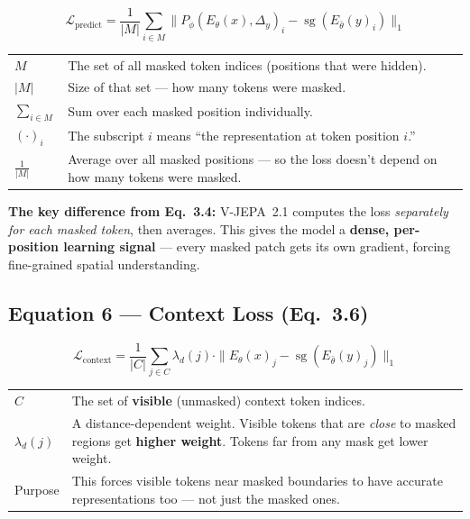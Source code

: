 \documentclass[12pt, a4paper]{article}
\begin{document}
\begin{eqbox}
\[
\mathcal{L}_{\text{predict}} = \frac{1}{|M|} \sum_{i \in M} \|P_\phi(E_\theta(x), \Delta_y)_i - \operatorname{sg}(E_{\bar{\theta}}(y)_i)\|_1
\]
\end{eqbox}

\begin{explainbox}
\begin{tabular}{lp{11cm}}
$M$ & The set of all masked token indices (positions that were hidden).\\[0.2cm]
$|M|$ & Size of that set --- how many tokens were masked.\\[0.2cm]
$\sum_{i \in M}$ & Sum over each masked position individually.\\[0.2cm]
$(\cdot)_i$ & The subscript $i$ means ``the representation at token position $i$.''\\[0.2cm]
$\frac{1}{|M|}$ & Average over all masked positions --- so the loss doesn't depend on how many tokens were masked.
\end{tabular}

\textbf{The key difference from Eq.~3.4:} V-JEPA~2.1 computes the loss \textit{separately for each masked token}, then averages. This gives the model a \textbf{dense, per-position learning signal} --- every masked patch gets its own gradient, forcing fine-grained spatial understanding.
\end{explainbox}


\subsection{Equation 6 --- Context Loss (Eq.~3.6)}

\begin{eqbox}
\[
\mathcal{L}_{\text{context}} = \frac{1}{|C|} \sum_{j \in C} \lambda_d(j) \cdot \|E_\theta(x)_j - \operatorname{sg}(E_{\bar{\theta}}(y)_j)\|_1
\]
\end{eqbox}

\begin{explainbox}
\begin{tabular}{lp{11cm}}
$C$ & The set of \textbf{visible} (unmasked) context token indices.\\[0.2cm]
$\lambda_d(j)$ & A distance-dependent weight. Visible tokens that are \textit{close} to masked regions get \textbf{higher weight}. Tokens far from any mask get lower weight.\\[0.2cm]
Purpose & This forces visible tokens near masked boundaries to have accurate representations too --- not just the masked ones.
\end{tabular}
\end{explainbox}
\end{document}
